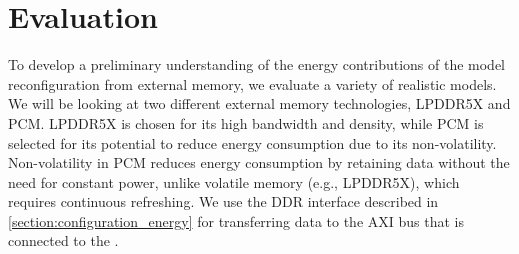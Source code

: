 \section{Evaluation}

To develop a preliminary understanding of the energy contributions of the model reconfiguration from external memory, we evaluate a variety of realistic models.
We will be looking at two different external memory technologies, LPDDR5X and PCM.
LPDDR5X is chosen for its high bandwidth and density, while PCM is selected for its potential to reduce energy consumption due to its non-volatility.
Non-volatility in PCM reduces energy consumption by retaining data without the need for constant power, unlike volatile memory (e.g., LPDDR5X), which requires continuous refreshing.
We use the DDR interface described in \cref{section:configuration_energy} for transferring data to the AXI bus that is connected to the \graicore{}.


